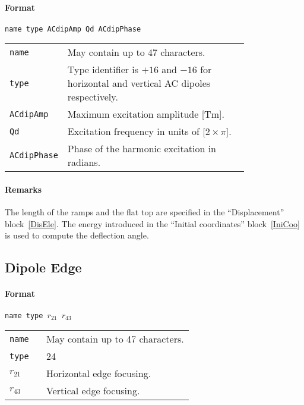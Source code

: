 \paragraph{Format} \texttt{name type ACdipAmp Qd ACdipPhase}

\bigskip
\begin{tabular}{@{}lp{0.8\linewidth}}
    \texttt{name} & May contain up to 47 characters. \\
    \texttt{type} & Type identifier is $+16$ and $-16$ for horizontal and vertical AC dipoles respectively. \\
    \texttt{ACdipAmp} & Maximum excitation amplitude [Tm]. \\
    \texttt{Qd}   & Excitation frequency in units of [$2 \times \pi$]. \\
    \texttt{ACdipPhase} & Phase of the harmonic excitation in radians.
\end{tabular}

\paragraph{Remarks}
The length of the ramps and the flat top are specified in the ``Displacement'' block~\ref{DisEle}. The energy introduced in the ``Initial coordinates'' block~\ref{IniCoo} is used to compute the deflection angle.

\subsection{Dipole Edge}

\paragraph{Format} \texttt{name type $r_{21}$ $r_{43}$}

\bigskip
\begin{tabular}{@{}lp{0.8\linewidth}}
    \texttt{name} & May contain up to 47 characters. \\
    \texttt{type} & 24 \\
    \texttt{$r_{21}$} & Horizontal edge focusing. \\
    \texttt{$r_{43}$} & Vertical edge focusing.
\end{tabular}

